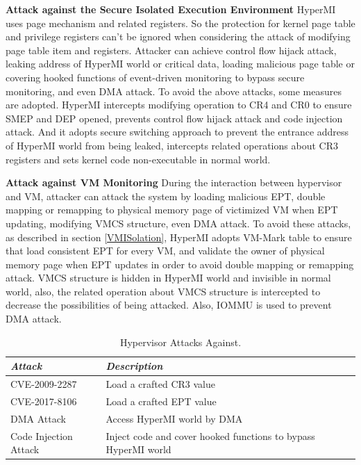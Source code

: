\documentclass[conference]{IEEEtran}
\begin{document}
\textbf{Attack against the Secure Isolated Execution Environment}
HyperMI uses page mechanism and related registers. So the protection for kernel page table and privilege registers can't be ignored when considering the attack of modifying page table item and registers. Attacker can achieve control flow hijack attack, leaking address of HyperMI world or critical data, loading malicious page table or covering hooked functions of event-driven monitoring to bypass secure monitoring, and even DMA attack. To avoid the above attacks, some measures are adopted. HyperMI intercepts modifying operation to CR4 and CR0 to ensure SMEP and DEP opened, prevents control flow hijack attack and code injection attack. And it 
adopts secure switching approach to prevent the entrance address of HyperMI world from being leaked, intercepts related operations about CR3 registers and sets kernel code non-executable in normal world. 

\textbf{Attack against VM Monitoring}
During the interaction between hypervisor and VM, attacker can attack the system by loading malicious EPT, double mapping or remapping to physical memory page of victimized VM when EPT updating, modifying VMCS structure, even DMA attack. To avoid these attacks, as described in section \ref{VMISolation}, HyperMI adopts VM-Mark table to ensure that load consistent EPT for every VM, and validate the owner of physical memory page when EPT updates in order to avoid double mapping or remapping attack. VMCS structure is hidden in HyperMI world and invisible in normal world, also, the related operation about VMCS structure is intercepted to decrease the possibilities of being attacked. Also, IOMMU is used to prevent DMA attack.
\begin{table}
\centering
\caption{Hypervisor Attacks Against.}\label{tab3}
\begin{tabular}{p{2.4cm}|p{5.5cm}}
\hline
{\itshape\bfseries Attack} & {\itshape\bfseries Description} \\
\hline
CVE-2009-2287 & Load a crafted CR3 value\\
\hline
CVE-2017-8106 & Load a crafted EPT value \\
\hline
DMA Attack & Access HyperMI world by DMA \\
\hline
Code Injection Attack & Inject code and cover hooked functions to bypass HyperMI world \\
\hline
\end{tabular}
\end{table}
\end{document}
